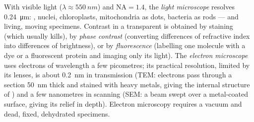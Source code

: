 \begin{proposition}\label{prop:b1:cell-unit-of-life:microscopes}
With visible light ($\lambda \approx \qty{550}{nm}$) and
$\mathrm{NA} = 1.4$, the \emph{light microscope} resolves \qty{0.24}{\micro m}: , nuclei, chloroplasts,
mitochondria as dots, bacteria as rods --- and living, moving specimens.
Contrast in a transparent  is obtained by staining (which usually
kills), by \emph{phase contrast} (converting differences of refractive
index into differences of brightness), or by \emph{fluorescence}
(labelling one molecule with a dye or a fluorescent protein and
imaging only its light). The \emph{electron microscope} uses electrons of wavelength a few picometres; its
practical resolution, limited by its lenses, is about \qty{0.2}{nm} in
transmission (TEM: electrons pass through a section \qty{50}{nm} thick
and stained with heavy metals, giving the internal structure of
) and a few nanometres in scanning (SEM: a beam swept over a
metal-coated surface, giving its relief in depth). Electron microscopy
requires a vacuum and dead, fixed, dehydrated specimens.
\end{proposition}

